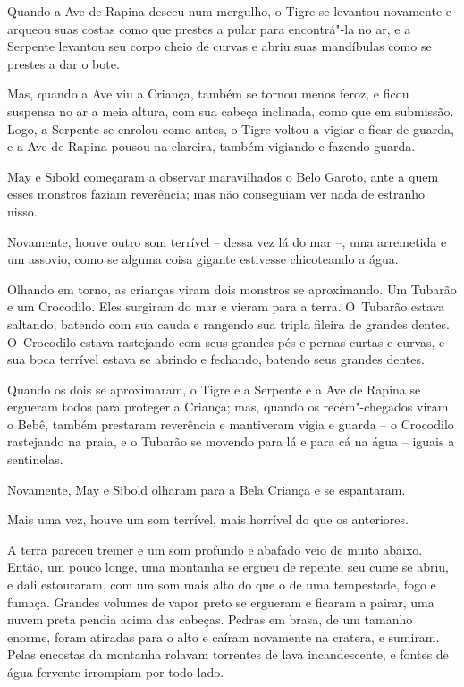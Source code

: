 Quando a Ave de Rapina desceu num mergulho, o Tigre se levantou
novamente e arqueou suas costas como que prestes a pular para
encontrá"-la no ar, e a Serpente levantou seu corpo cheio de curvas e
abriu suas mandíbulas como se prestes a dar o bote.

Mas, quando a Ave viu a Criança, também se tornou menos feroz, e
ficou suspensa no ar a meia altura, com sua cabeça inclinada, como que
em submissão. Logo, a Serpente se enrolou como antes, o Tigre voltou a
vigiar e ficar de guarda, e a Ave de Rapina pousou na clareira, também
vigiando e fazendo guarda.

May e Sibold começaram a observar maravilhados o Belo Garoto, ante a
quem esses monstros faziam reverência; mas não conseguiam ver nada
de estranho nisso.

Novamente, houve outro som terrível -- dessa vez lá do mar --, uma
arremetida e um assovio, como se alguma coisa gigante estivesse
chicoteando a água.

Olhando em torno, as crianças viram dois monstros se aproximando. Um
Tubarão e um Crocodilo. Eles surgiram do mar e vieram para a terra. O~Tubarão estava saltando, batendo com sua cauda e rangendo sua tripla
fileira de grandes dentes. O~Crocodilo estava rastejando com seus
grandes pés e pernas curtas e curvas, e sua boca terrível estava se abrindo
e fechando, batendo seus grandes dentes.

Quando os dois se aproximaram, o Tigre e a Serpente e a Ave de Rapina se
ergueram todos para proteger a Criança; mas, quando os recém"-chegados
viram o Bebê, também prestaram reverência e mantiveram vigia e guarda --
o Crocodilo rastejando na praia, e o Tubarão se movendo para lá e para
cá na água -- iguais a sentinelas.

Novamente, May e Sibold olharam para a Bela Criança e se espantaram.

Mais uma vez, houve um som terrível, mais horrível do que os anteriores.

A terra pareceu tremer e um som profundo e abafado veio de muito abaixo.
Então, um pouco longe, uma montanha se ergueu de repente; seu cume se
abriu, e dali estouraram, com um som mais alto do que o de uma
tempestade, fogo e fumaça. Grandes volumes de vapor preto se ergueram e
ficaram a pairar, uma nuvem preta pendia acima das cabeças. Pedras em
brasa, de um tamanho enorme, foram atiradas para o alto e caíram
novamente na cratera, e sumiram. Pelas encostas da montanha rolavam
torrentes de lava incandescente, e fontes de água fervente irrompiam por
todo lado.

